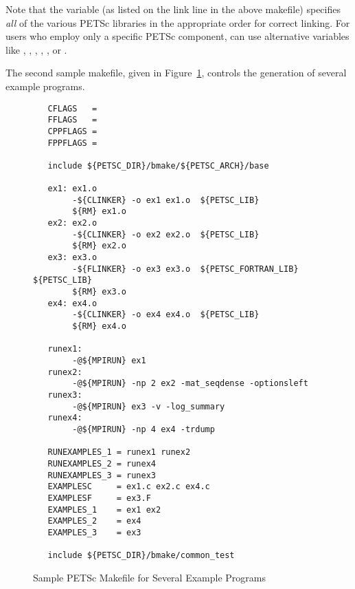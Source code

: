  
Note that the variable  (as listed on the link
line in the above makefile) specifies {\em all} of the various PETSc
libraries in the appropriate order for correct linking.  For users who
employ only a specific PETSc component, can use alternative variables
like  , , 
, ,
,  or
.

The second sample makefile, given in Figure~\ref{fig:make2},
controls the generation of several example programs. 

\begin{figure}[H]
{\small
\begin{verbatim}
   CFLAGS   = 
   FFLAGS   = 
   CPPFLAGS =
   FPPFLAGS =

   include ${PETSC_DIR}/bmake/${PETSC_ARCH}/base

   ex1: ex1.o 
        -${CLINKER} -o ex1 ex1.o  ${PETSC_LIB}
        ${RM} ex1.o
   ex2: ex2.o 
        -${CLINKER} -o ex2 ex2.o  ${PETSC_LIB}
        ${RM} ex2.o
   ex3: ex3.o 
        -${FLINKER} -o ex3 ex3.o  ${PETSC_FORTRAN_LIB} ${PETSC_LIB}
        ${RM} ex3.o
   ex4: ex4.o 
        -${CLINKER} -o ex4 ex4.o  ${PETSC_LIB}
        ${RM} ex4.o

   runex1:
        -@${MPIRUN} ex1
   runex2:
        -@${MPIRUN} -np 2 ex2 -mat_seqdense -optionsleft
   runex3:
        -@${MPIRUN} ex3 -v -log_summary
   runex4:
        -@${MPIRUN} -np 4 ex4 -trdump

   RUNEXAMPLES_1 = runex1 runex2
   RUNEXAMPLES_2 = runex4
   RUNEXAMPLES_3 = runex3
   EXAMPLESC     = ex1.c ex2.c ex4.c
   EXAMPLESF     = ex3.F
   EXAMPLES_1    = ex1 ex2
   EXAMPLES_2    = ex4
   EXAMPLES_3    = ex3

   include ${PETSC_DIR}/bmake/common_test
\end{verbatim}
}
\caption{Sample PETSc Makefile for Several Example Programs}
\label{fig:make2}
\end{figure}

